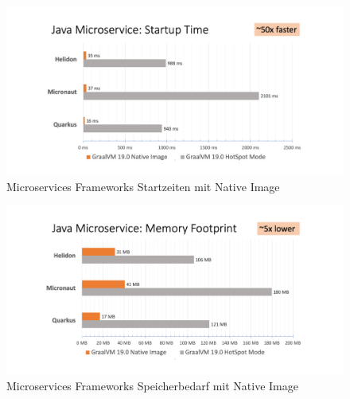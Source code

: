 \begin{figure}[h]
	\centering
	\includegraphics[width=.9\textwidth]{resources/ms_startup_time.png}
	\caption{Microservices Frameworks Startzeiten mit Native Image \parencite{GraalVMBenchmarks}}
	\label{fig:system_startuptime}
\end{figure}
\begin{figure}[h]
	\centering
	\includegraphics[width=.9\textwidth]{resources/ms_memory_footprint.png}
	\caption{Microservices Frameworks Speicherbedarf mit Native Image \parencite{GraalVMBenchmarks}}
	\label{fig:system_memory_footprint}
\end{figure}
